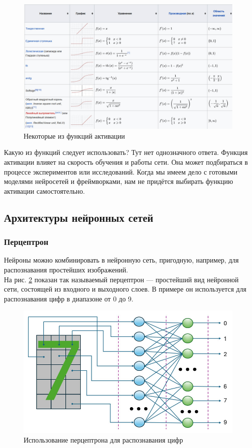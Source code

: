 \begin{figure}[H]
    \centering
    \includegraphics[width = 12cm]{funcs.jpg}
    \caption{Некоторые из функций активации}
    \label{funcs}
\end{figure}

Какую из функций следует использовать? Тут нет однозначного ответа. Функция активации влияет на скорость обучения и работы сети. Она может подбираться в процессе экспериментов или исследований. Когда мы имеем дело с готовыми моделями нейросетей и фреймворками, нам не придётся выбирать функцию активации самостоятельно.

\subsection{Архитектуры нейронных сетей}

\subsubsection*{Перцептрон}
Нейроны можно комбинировать в нейронную сеть, пригодную, например, для распознавания простейших изображений.\\

На рис. \ref{perceptron} показан так называемый перцептрон — простейший вид нейронной сети, состоящей из входного и выходного слоев. В примере он используется для распознавания цифр в диапазоне от 0 до 9.

\begin{figure}[H]
    \centering
    \includegraphics[width = 12cm]{perceptron.jpg}
    \caption{Использование перцептрона для распознавания цифр}
    \label{perceptron}
\end{figure}

